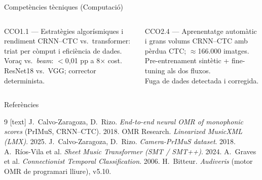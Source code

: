\documentclass[aspectratio=169,10pt]{beamer}
\begin{document}
\begin{frame}{Competències tècniques (Computació)}
  \begin{columns}[T]
    \begin{block}{CCO1.1 — Estratègies algorísmiques i rendiment}
      {\small
      CRNN--CTC vs.\ transformer: triat per còmput i eficiència de dades.\\[0.3em]
      Voraç vs.\ \textit{beam}: $<$0,01 pp a 8× cost.\\[0.3em]
      ResNet18 vs.\ VGG; corrector determinista.}
    \end{block}

    \begin{block}{CCO2.4 — Aprenentatge automàtic i grans volums}
      {\small
      CRNN--CTC amb pèrdua CTC; $\approx$166.000 imatges.\\[0.3em]
      Pre-entrenament sintètic + fine-tuning als dos fluxos.\\[0.3em]
      Fuga de dades detectada i corregida.}
    \end{block}
  \end{columns}
  \vspace{0.5em}
\end{frame}

\begin{frame}{Referències}
  \vspace{0.3em}
  \footnotesize
  \begin{thebibliography}{9}
    [text]
     J.\ Calvo-Zaragoza, D.\ Rizo.
      \emph{End-to-end neural OMR of monophonic scores} (PrIMuS, CRNN--CTC). 2018.
     OMR Research.
      \emph{Linearized MusicXML (LMX)}. 2025.
     J.\ Calvo-Zaragoza, D.\ Rizo.
      \emph{Camera-PrIMuS dataset}. 2018.
     A.\ Ríos-Vila et al.
      \emph{Sheet Music Transformer (SMT / SMT++)}. 2024.
     A.\ Graves et al.
      \emph{Connectionist Temporal Classification}. 2006.
     H.\ Bitteur.
      \emph{Audiveris} (motor OMR de programari lliure), v5.10.
  \end{thebibliography}
\end{frame}
\end{document}
